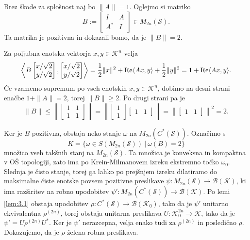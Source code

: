 \begin{dokaz}
    Brez škode za splošnost naj bo $\| A\| = 1$. Oglejmo si matriko 
    $$B := \begin{bmatrix}
        I & A\\
        A^* & I
    \end{bmatrix} \in M_{2n} (\mathcal{S}).$$
    Ta matrika je pozitivna in dokazali bomo, da je $\| B\| = 2$.

    Za poljubna enotska vektorja $x, y \in \mathcal{K}^n$ velja 
    $$\left\langle B \begin{bmatrix}
        x/\sqrt{2}\\ y/\sqrt{2}
    \end{bmatrix}, \begin{bmatrix}
        x/\sqrt{2}\\ y/\sqrt{2}
    \end{bmatrix} \right\rangle = \frac{1}{2} \| x\|^2 + \operatorname{Re} \langle A x, y \rangle + \frac{1}{2} \| y\|^2 = 1 + \operatorname{Re} \langle A x, y \rangle.$$
    Če vzamemo supremum po vseh enotskih $x, y \in \mathcal{K}^n$, dobimo na desni strani enačbe $1 + \|A\| = 2$,
    torej $\| B\| \geq 2$. Po drugi strani pa je 
    $$\| B\| \leq \left\| \begin{bmatrix}
        1 & 1\\
        1 & 1
    \end{bmatrix} \right\| = \left\| \begin{bmatrix}
        1 \\ 1
    \end{bmatrix} \begin{bmatrix}
        1 & 1
    \end{bmatrix} \right\| = \left\| \begin{bmatrix}
        1 & 1
    \end{bmatrix} \right\|^2 = 2.$$
    
    Ker je $B$ pozitivna, obstaja neko stanje $\omega$ na $M_{2n} (C^* (\mathcal{S}))$.
    Označimo s $$K = \{\omega \in S(M_{2n} (\mathcal{S}))\ |\ \omega (B) = 2\}$$
    množico vseh takšnih stanj na $M_{2n} (\mathcal{S})$.
    Ta množica je konveksna in kompaktna v OŠ topologiji, zato ima po Krein-Milmanovem izreku 
    ekstremno točko $\omega_0$. Slednja je čisto stanje, torej ga lahko po prejšnjem izreku 
    dilatiramo do maksimalne čiste enotske povsem pozitivne preslikave $\psi: M_{2n} (\mathcal{S}) \to \mathcal{B}(\mathcal{K})$,
    ki ima razširitev na robno upodobitev $\psi': M_{2n}(C^* (\mathcal{S})) \to \mathcal{B}(\mathcal{K})$.
    Po lemi \ref{lem:3.1} obstaja upodobitev $\rho : C^* (\mathcal{S}) \to \mathcal{B}(\mathcal{K}_0)$, tako da je $\psi'$ unitarno ekvivalentna $\rho ^{(2n)}$,
    torej obstaja unitarna preslikava $U: \mathcal{K}_0 ^{2n} \to \mathcal{K}$, tako da je $\psi' = U \rho^{(2n)} U^*$.
    Ker je $\psi'$ nerazcepna, velja enako tudi za $\rho^{(2n)}$ in posledično $\rho$.
    Dokazujemo, da je $\rho$ želena robna preslikava.


\end{dokaz}

